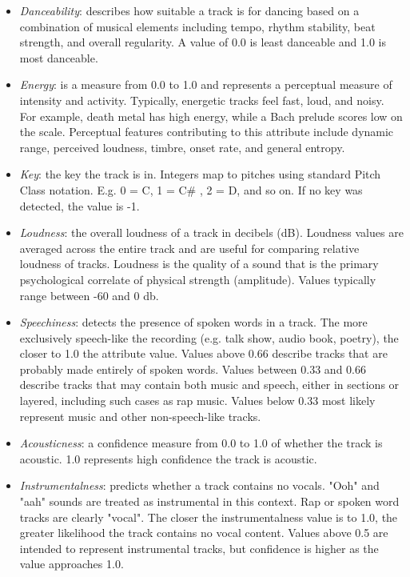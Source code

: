 \documentclass[11pt]{article} %
\begin{document}
\begin{itemize}
	\item \textit{Danceability}: describes how suitable a track is for dancing based on a combination of musical elements including tempo, rhythm stability, beat strength, and overall regularity. A value of 0.0 is least danceable and 1.0 is most danceable.
	\item \textit{Energy}: is a measure from 0.0 to 1.0 and represents a perceptual measure of intensity and activity. Typically, energetic tracks feel fast, loud, and noisy. For example, death metal has high energy, while a Bach prelude scores low on the scale. Perceptual features contributing to this attribute include dynamic range, perceived loudness, timbre, onset rate, and general entropy.
	\item \textit{Key}: the key the track is in. Integers map to pitches using standard Pitch Class notation. E.g. 0 = C, 1 = C\# , 2 = D, and so on. If no key was detected, the value is -1.
	\item \textit{Loudness}: the overall loudness of a track in decibels (dB). Loudness values are averaged across the entire track and are useful for comparing relative loudness of tracks. Loudness is the quality of a sound that is the primary psychological correlate of physical strength (amplitude). Values typically range between -60 and 0 db.
	\item \textit{Speechiness}: detects the presence of spoken words in a track. The more exclusively speech-like the recording (e.g. talk show, audio book, poetry), the closer to 1.0 the attribute value. Values above 0.66 describe tracks that are probably made entirely of spoken words. Values between 0.33 and 0.66 describe tracks that may contain both music and speech, either in sections or layered, including such cases as rap music. Values below 0.33 most likely represent music and other non-speech-like tracks.
	\item \textit{Acousticness}: a confidence measure from 0.0 to 1.0 of whether the track is acoustic. 1.0 represents high confidence the track is acoustic.
	\item \textit{Instrumentalness}: predicts whether a track contains no vocals. "Ooh" and "aah" sounds are treated as instrumental in this context. Rap or spoken word tracks are clearly "vocal". The closer the instrumentalness value is to 1.0, the greater likelihood the track contains no vocal content. Values above 0.5 are intended to represent instrumental tracks, but confidence is higher as the value approaches 1.0.

\end{itemize}
\end{document}
